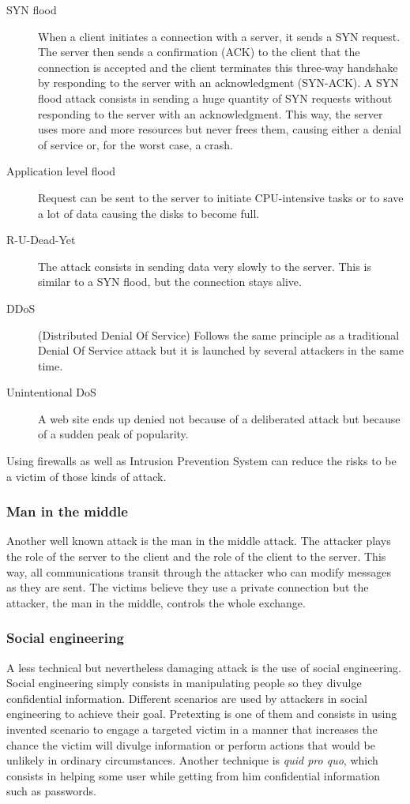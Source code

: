 \begin{description}
\item[SYN flood]
When a client initiates a connection with a server, it sends a SYN request.
The server then sends a confirmation (ACK) to the client that the connection
is accepted and the client terminates this three-way handshake by responding
to the server with an acknowledgment (SYN-ACK).
A SYN flood attack consists in sending a huge quantity of SYN
requests without responding to the server with an acknowledgment. This way, the
server uses more and more resources but never frees them, causing either a denial
of service or, for the worst case, a crash.
\item[Application level flood]
Request can be sent to the server to initiate CPU-intensive tasks or
to save a lot of data causing the disks to become full.
\item[R-U-Dead-Yet]
The attack consists in sending data very slowly to the server. This is similar
to a SYN flood, but the connection stays alive.
\item[DDoS] (Distributed Denial Of Service)
Follows the same principle as a traditional Denial Of Service attack but it is
launched by several attackers in the same time.
\item[Unintentional DoS]
A web site ends up denied not because of a deliberated attack but because of a
sudden peak of popularity.
\end{description}
Using firewalls as well as Intrusion Prevention System can reduce the risks to
be a victim of those kinds of attack.

\subsubsection{Man in the middle}

Another well known attack is the man in the middle attack. The
attacker plays the role of the server to the client and the role of the client
to the server. This way, all communications transit through the attacker who can
modify messages as they are sent. The victims believe they use a private
connection but the attacker, the man in the middle, controls the whole exchange.

\subsubsection{Social engineering}

A less technical but nevertheless damaging attack is the use of social
engineering. Social engineering simply consists in manipulating people so they
divulge confidential information. Different scenarios are used by attackers in
social engineering to achieve their goal. Pretexting is one of them and consists
in using invented scenario to engage a targeted victim in a manner that
increases the chance the victim will divulge information or perform actions
that would be unlikely in ordinary circumstances. Another technique is
\textit{quid pro quo}, which consists in helping some user while getting from
him confidential information such as passwords.

